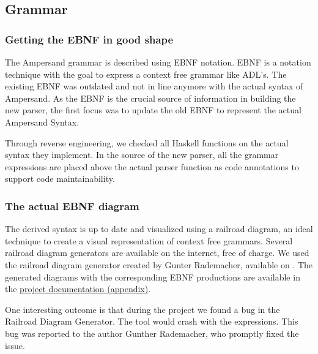 
\subsection{Grammar}
\label{analysis:grammar}

\subsubsection{Getting the EBNF in good shape}
%
%
The Ampersand grammar is described using EBNF notation. 
EBNF is a notation technique with the goal to express a context free grammar like ADL's.
The existing EBNF was outdated and not in line anymore with the actual syntax of Ampersand.
As the EBNF is the crucial source of information in building the new parser, the first focus was to update the old EBNF to represent the actual Ampersand Syntax.

Through reverse engineering, we checked all Haskell functions on the actual syntax they implement.
In the source of the new parser, all the grammar expressions are placed above the actual parser function as code annotations to support code maintainability.

\subsubsection{The actual EBNF diagram}
The derived syntax is up to date and visualized using a railroad diagram, an ideal technique to create a visual representation of context free grammars.
Several railroad diagram generators are available on the internet, free of charge.
We used the railroad diagram generator created by Gunter Rademacher, available on .
The generated diagrams with the corresponding EBNF productions are available in the \hyperref[app:docs]{project documentation (appendix)}.

One interesting outcome is that during the project we found a bug in the Railroad Diagram Generator.
The tool would crash with the  expressions.
This bug was reported to the author Gunther Rademacher, who promptly fixed the issue.
